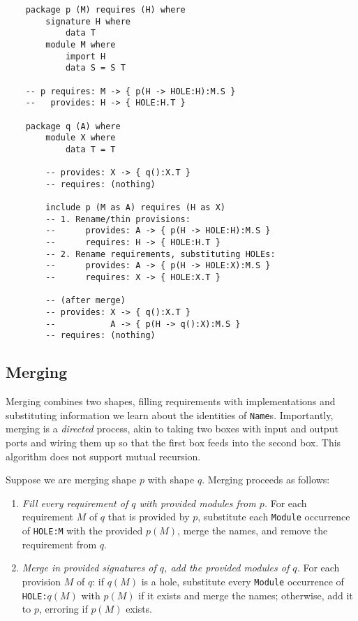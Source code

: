 \documentclass{article}
\begin{document}
\begin{verbatim}
    package p (M) requires (H) where
        signature H where
            data T
        module M where
            import H
            data S = S T

    -- p requires: M -> { p(H -> HOLE:H):M.S }
    --   provides: H -> { HOLE:H.T }

    package q (A) where
        module X where
            data T = T

        -- provides: X -> { q():X.T }
        -- requires: (nothing)

        include p (M as A) requires (H as X)
        -- 1. Rename/thin provisions:
        --      provides: A -> { p(H -> HOLE:H):M.S }
        --      requires: H -> { HOLE:H.T }
        -- 2. Rename requirements, substituting HOLEs:
        --      provides: A -> { p(H -> HOLE:X):M.S }
        --      requires: X -> { HOLE:X.T }

        -- (after merge)
        -- provides: X -> { q():X.T }
        --           A -> { p(H -> q():X):M.S }
        -- requires: (nothing)
\end{verbatim}

\newpage

\subsection{Merging}

Merging combines two shapes, filling requirements with implementations
and substituting information we learn about the identities of
\verb|Name|s.  Importantly, merging is a \emph{directed} process, akin
to taking two boxes with input and output ports and wiring them up so
that the first box feeds into the second box.  This algorithm does not
support mutual recursion.

Suppose we are merging shape $p$ with shape $q$.  Merging proceeds as follows:

\begin{enumerate}
    \item \emph{Fill every requirement of $q$ with provided modules from
        $p$.} For each requirement $M$ of $q$ that is provided by $p$,
        substitute each \verb|Module| occurrence of \verb|HOLE:M| with the
        provided $p(M)$, merge the names, and remove the requirement from $q$.
    \item \emph{Merge in provided signatures of $q$, add the provided modules of $q$.}
        For each provision $M$ of $q$: if $q(M)$ is a hole, substitute every
        \verb|Module| occurrence of \verb|HOLE:|$q(M)$ with $p(M)$ if it exists and merge
        the names; otherwise, add it to $p$, erroring if $p(M)$ exists.
\end{enumerate}
\end{document}
